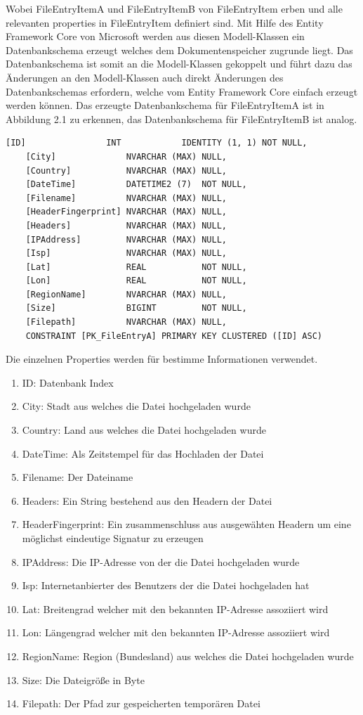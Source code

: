 \documentclass[
    fontsize=12pt,
    headings=small,
    parskip=half,           %
    bibliography=totoc,
    numbers=noenddot,       %
    open=any,               %
    ]{scrreprt}
\begin{document}
Wobei FileEntryItemA und FileEntryItemB von FileEntryItem erben und alle relevanten properties in FileEntryItem definiert sind. Mit Hilfe des Entity Framework Core von Microsoft werden aus diesen Modell-Klassen ein Datenbankschema erzeugt welches dem Dokumentenspeicher zugrunde liegt. Das Datenbankschema ist somit an die Modell-Klassen gekoppelt und führt dazu das Änderungen an den Modell-Klassen auch direkt Änderungen des Datenbankschemas erfordern, welche vom Entity Framework Core einfach erzeugt werden können. Das erzeugte Datenbankschema für FileEntryItemA ist in Abbildung 2.1 zu erkennen, das Datenbankschema für FileEntryItemB ist analog.

\begin{lstlisting}[caption={Datenbank Schema für FileEntryItemA},label={lst:ggt}]
[ID]                INT            IDENTITY (1, 1) NOT NULL,
    [City]              NVARCHAR (MAX) NULL,
    [Country]           NVARCHAR (MAX) NULL,
    [DateTime]          DATETIME2 (7)  NOT NULL,
    [Filename]          NVARCHAR (MAX) NULL,
    [HeaderFingerprint] NVARCHAR (MAX) NULL,
    [Headers]           NVARCHAR (MAX) NULL,
    [IPAddress]         NVARCHAR (MAX) NULL,
    [Isp]               NVARCHAR (MAX) NULL,
    [Lat]               REAL           NOT NULL,
    [Lon]               REAL           NOT NULL,
    [RegionName]        NVARCHAR (MAX) NULL,
    [Size]              BIGINT         NOT NULL,
    [Filepath]          NVARCHAR (MAX) NULL,
    CONSTRAINT [PK_FileEntryA] PRIMARY KEY CLUSTERED ([ID] ASC)
\end{lstlisting}

Die einzelnen Properties werden für bestimme Informationen verwendet.

\begin{enumerate}
\item ID: Datenbank Index
\item City: Stadt aus welches die Datei hochgeladen wurde
\item Country: Land aus welches die Datei hochgeladen wurde
\item DateTime: Als Zeitstempel für das Hochladen der Datei
\item Filename: Der Dateiname
\item Headers: Ein String bestehend aus den Headern der Datei
\item HeaderFingerprint: Ein zusammenschluss aus ausgewähten Headern um eine möglichst eindeutige Signatur zu erzeugen
\item IPAddress: Die IP-Adresse von der die Datei hochgeladen wurde
\item Isp: Internetanbierter des Benutzers der die Datei hochgeladen hat
\item Lat: Breitengrad welcher mit den bekannten IP-Adresse assoziiert wird
\item Lon: Längengrad welcher mit den bekannten IP-Adresse assoziiert wird
\item RegionName: Region (Bundesland) aus welches die Datei hochgeladen wurde
\item Size: Die Dateigröße in Byte
\item Filepath: Der Pfad zur gespeicherten temporären Datei
\end{enumerate}
\end{document}
